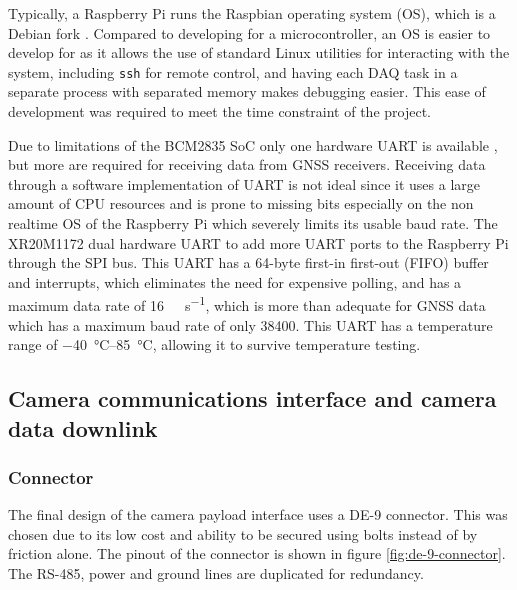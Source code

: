 \documentclass[]{report}
\begin{document}
Typically, a Raspberry Pi runs the Raspbian operating system (OS), which is a Debian fork \cite{upton2016raspberry}. Compared to developing for a microcontroller, an OS is easier to develop for as it allows the use of standard Linux utilities for interacting with the system, including \texttt{ssh} for remote control, and having each DAQ task in a separate process with separated memory makes debugging easier. This ease of development was required to meet the time constraint of the project. %

Due to limitations of the BCM2835 SoC only one hardware UART is available \cite{upton2016raspberry}, but more are required for receiving data from GNSS receivers. Receiving data through a software implementation of UART is not ideal since it uses a large amount of CPU resources and is prone to missing bits especially on the non realtime OS of the Raspberry Pi which severely limits its usable baud rate. The XR20M1172 dual hardware UART to add more UART ports to the Raspberry Pi through the SPI bus. This UART has a 64-byte first-in first-out (FIFO) buffer and interrupts, which eliminates the need for expensive polling, and has a maximum data rate of \SI{16}{\mega\bit\per\second}, which is more than adequate for GNSS data \cite{maxlinear2022xr20m1172} which has a maximum baud rate of only \SI{38400}{\baud}. This UART has a temperature range of \SIrange{-40}{85}{\degreeCelsius}, allowing it to survive temperature testing.


\subsection{Camera communications interface and camera data downlink}

\subsubsection{Connector}
The final design of the camera payload interface uses a DE-9 connector. This was chosen due to its low cost and ability to be secured using bolts instead of by friction alone. The pinout of the connector is shown in figure \ref{fig:de-9-connector}. The RS-485, power and ground lines are duplicated for redundancy.
\end{document}
